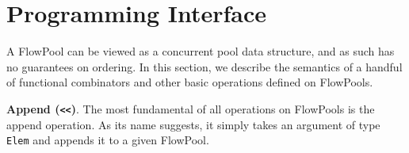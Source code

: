 \documentclass[runningheads,a4paper]{llncs}
\begin{document}




\section{Programming Interface}
\label{sec:programming-interface}

A FlowPool can be viewed as a concurrent pool data structure, and as such has
no guarantees on ordering. In this section, we describe the semantics of a
handful of functional combinators and other basic operations defined on
FlowPools.

\textbf{Append (\texttt{<<})}. The most fundamental of all
operations on FlowPools is the append operation. As its name suggests, it
simply takes an argument of type \texttt{Elem} and appends it to a given
FlowPool. 

\end{document}
